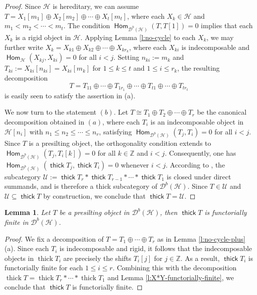 \documentclass[12pt,a4paper,reqno]{amsart}
\newtheorem{lemma}[theorem]{Lemma}
\theoremstyle{definition}
\newcommand{\opname}[1]{\operatorname{\mathsf{#1}}}
\newcommand{\der}{\cd}
\newcommand{\thick}{\opname{thick}}
\newcommand{\Hom}{\opname{Hom}}
\newcommand{\cd}{{\mathcal D}}
\begin{document}
\begin{proof}
Since $\mathcal{H}$ is hereditary, we can assume $T = X_1[m_1] \oplus X_2[m_2] \oplus \cdots \oplus X_t[m_t]$, where each $X_k \in \mathcal{H}$ and $m_1 < m_2 < \cdots < m_t$. The condition $\Hom_{\der^b(\mathcal{H})}(T,T[1])=0$ implies that each $X_k$ is a rigid object in $\mathcal{H}$. Applying Lemma \ref{l:no-cycle} to each $X_k$,  we may further write $X_k = X_{k1} \oplus X_{k2} \oplus \cdots \oplus X_{kr_k}$, where each $X_{ki}$ is indecomposable and $\Hom_{\mathcal{H}}(X_{kj}, X_{ki}) = 0$ for all $i < j$. Setting $n_{ki} := m_k$ and $T_{ki} := X_{ki}[n_{ki}] = X_{ki}[m_k]$ for $1 \leq k \leq t$ and $1 \leq i \leq r_k$, the resulting decomposition \[T = T_{11} \oplus \cdots \oplus T_{1r_1} \oplus \cdots \oplus T_{t1} \oplus \cdots \oplus T_{tr_t}\] is easily seen to satisfy the assertion in (a).

We now turn to the statement $(b)$. Let $T \cong T_1 \oplus T_2 \oplus \cdots \oplus T_r$ be the canonical decomposition obtained in $(a)$, where each $T_i$ is an indecomposable object in $\mathcal{H}[n_i]$ with $n_1 \leq n_2 \leq \cdots \leq n_r$, satisfying $\Hom_{\mathcal{D}^b(\mathcal{H})}(T_j, T_i) = 0$ for all $i < j$. 
 Since $T$ is a presilting object, the orthogonality condition extends to $\Hom_{\mathcal{D}^b(\mathcal{H})}(T_j, T_i[k]) = 0$ for all $k \in \mathbb{Z}$ and $i < j$. 
 Consequently, one has $\Hom_{\der^b(\mathcal{H})}(\thick T_j, \thick T_i) = 0$ whenever $i < j$. 
 According to \cite[Lemma 2.22 (a)]{AiharaIyama},  the subcategory $\mathcal{U} := \thick T_r * \thick T_{r-1} * \cdots * \thick T_1$ is closed under direct summands, and is therefore a thick subcategory of $\der^b(\mathcal{H})$. Since $T \in \mathcal{U}$ and $\mathcal{U} \subseteq \thick T$ by construction, we conclude that $\thick T = \mathcal{U}$.
\end{proof}



\begin{lemma}\label{l:functorially-finite}
Let $T$ be a presilting object in $\der^b (\mathcal{H})$, then $\thick T$ is functorially finite in $\der^b (\mathcal{H})$.
\end{lemma}
\begin{proof} 
We fix a decomposition of $T=T_1\oplus\cdots\oplus T_r$ as in Lemma \ref{l:no-cycle-plus} (a). Since each $T_i$ is indecomposable and rigid, it follows that the indecomposable objects in $\operatorname{thick} T_i$ are precisely the shifts $T_i[j]$ for $j \in \mathbb{Z}$. As a result, $\thick T_i$ is functorially finite for each $1\leq i\leq r$. Combining this with the decomposition $\operatorname{thick} T = \operatorname{thick} T_r * \cdots * \operatorname{thick} T_1$ and Lemma \ref{l:X*Y-functorially-finite}, we conclude that $\thick T$ is functorially finite.



\end{proof}
\end{document}
